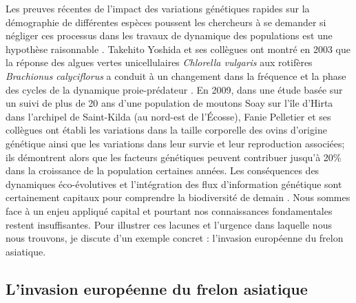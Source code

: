 Les preuves récentes de l'impact des variations génétiques rapides sur
la démographie de différentes espèces poussent les chercheurs à se
demander si négliger ces processus dans les travaux de dynamique des
populations est une hypothèse raisonnable
\citep{Pelletier2009, Post2009, Schoener2011}. Takehito Yoshida et ses
collègues ont montré en 2003 que la réponse des algues vertes
unicellulaires \emph{Chlorella vulgaris} aux rotifères \emph{Brachionus
calyciflorus} a conduit à un changement dans la fréquence et la phase
des cycles de la dynamique proie-prédateur \citep{Yoshida2003}. En 2009,
dans une étude basée sur un suivi de plus de 20 ans d'une population de
moutons Soay sur l'île d'Hirta dans l'archipel de Saint-Kilda (au
nord-est de l'Écosse), Fanie Pelletier et ses collègues ont établi les
variations dans la taille corporelle des ovins d'origine génétique ainsi
que les variations dans leur survie et leur reproduction associées; ils
démontrent alors que les facteurs génétiques peuvent contribuer jusqu'à
20\% dans la croissance de la population certaines années. Les
conséquences des dynamiques éco-évolutives et l'intégration des flux
d'information génétique sont certainement capitaux pour comprendre la
biodiversité de demain \citep{Sexton2009, Lavergne2010}. Nous sommes
face à un enjeu appliqué capital et pourtant nos connaissances
fondamentales restent insuffisantes. Pour illustrer ces lacunes et
l'urgence dans laquelle nous nous trouvons, je discute d'un exemple
concret : l'invasion européenne du frelon asiatique.

\subsection*{L'invasion européenne du frelon
asiatique}\label{linvasion-europuxe9enne-du-frelon-asiatique}

